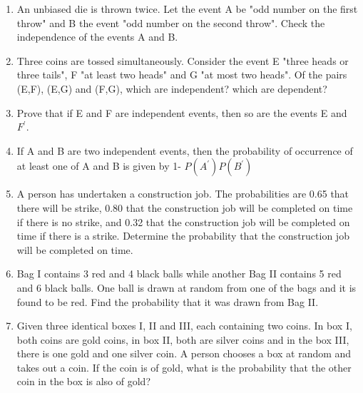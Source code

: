 \begin{enumerate}[label=\arabic*.,ref=\thesubsection.\theenumi]
\item An unbiased die is thrown twice. Let the event A be "odd number on the first throw" and B the event "odd number on the second throw". Check the independence of the events A and B.\\
\solution


\item Three coins are tossed simultaneously. Consider the event E "three heads or three tails", F "at least two heads" and G "at most two heads". Of the pairs (E,F), (E,G) and (F,G), which are independent? which are dependent?\\
\solution


\item Prove that if E and F are independent events, then so are the events E and $F^{'}$.\\
\solution


\item If A and B are two independent events, then the probability of occurrence of at least one of A and B is given by 1- $P(A^{'}) P(B^{'})$\\
\solution


\item A person has undertaken a construction job. The probabilities are 0.65 that there will be strike, 0.80 that the construction job will be completed on time if there is no strike, and 0.32 that the construction job will be completed on time if there is a strike. Determine the probability that the construction job will be completed on time.\\
\solution


\item Bag I contains 3 red and 4 black balls while another Bag II contains 5 red and 6 black balls. One ball is drawn at random from one of the bags and it is found to be red. Find the probability that it was drawn from Bag II.\\
\solution


\item Given three identical boxes I, II and III, each containing two coins. In box I, both coins are gold coins, in box II, both are silver coins and in the box III, there is one gold and one silver coin. A person chooses a box at random and takes out a coin. If the coin is of gold, what is the probability that the other coin in the box is also of gold?\\


\end{enumerate}
